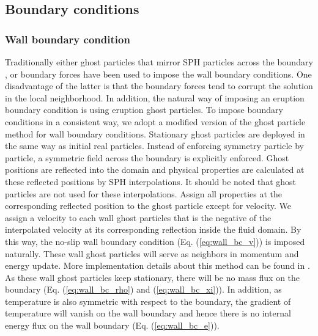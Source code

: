 \documentclass[journal abbreviation, manuscript]{copernicus}
\begin{document}
\subsection{Boundary conditions}
\subsubsection{Wall boundary condition}
Traditionally either ghost particles that mirror SPH particles across the boundary \citep {ferrari2009new}, or boundary forces \citep {monaghan2009sph} have been used to impose the wall boundary conditions. One disadvantage of the latter  is that the boundary forces tend to corrupt the solution in the local neighborhood. In addition, the natural way of imposing an eruption boundary condition is using eruption ghost particles. To impose boundary conditions in a consistent way, we adopt a modified version of the ghost particle method \citep {kumar2013parallel} for wall boundary conditions. Stationary ghost particles are deployed in the same way as initial  real particles. Instead of enforcing symmetry particle by particle, a symmetric field across the boundary is explicitly enforced. Ghost positions are reflected into the domain and physical properties are calculated at these reflected positions by SPH interpolations. It should be noted that ghost particles are not used for these interpolations. Assign all properties at the corresponding reflected position to the ghost particle except for velocity. We assign a velocity to each wall ghost particles that is the negative of the interpolated velocity at its corresponding reflection inside the fluid domain. By this way, the no-slip wall boundary condition (Eq. (\ref{eq:wall_bc_v})) is imposed naturally. These wall ghost particles will serve as neighbors in momentum and energy update. More implementation details about this method can be found in \citep {kumar2013parallel}. As these wall ghost particles keep stationary, there will be no mass flux on the boundary (Eq. (\ref{eq:wall_bc_rho}) and (\ref{eq:wall_bc_xi})). In addition, as temperature is also symmetric with respect to the boundary, the gradient of temperature will vanish on the wall boundary and hence there is no internal energy flux on the wall boundary (Eq. (\ref{eq:wall_bc_e})). 
\end{document}
